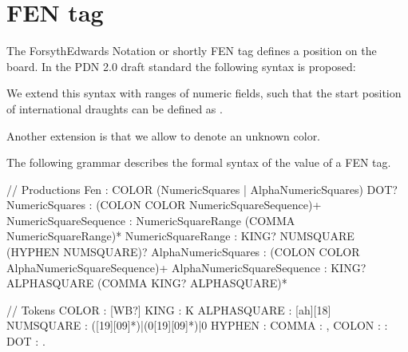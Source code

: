 \documentclass[letterpaper,10pt,english]{sphinxmanual}
\begin{document}
\sphinxstepscope


\chapter{FEN tag}
\label{\detokenize{fen:fen-tag}}\label{\detokenize{fen:fen-section}}\label{\detokenize{fen::doc}}
\sphinxAtStartPar
The Forsyth\sphinxhyphen{}Edwards Notation or shortly FEN tag defines a position on the board.
In the PDN 2.0 draft standard the following syntax is proposed:

\sphinxAtStartPar
{}

\sphinxAtStartPar
We extend this syntax with ranges of numeric fields, such that the start
position of international draughts can be defined as .

\sphinxAtStartPar
Another extension is that we allow  to denote an unknown color.

\sphinxAtStartPar
The following grammar describes the formal syntax of the value of a FEN tag.

\begin{sphinxVerbatim}[commandchars=\\\{\}]
// Productions
Fen                        : COLOR (NumericSquares | AlphaNumericSquares) DOT?
NumericSquares             : (COLON COLOR NumericSquareSequence)+
NumericSquareSequence      : NumericSquareRange (COMMA NumericSquareRange)*
NumericSquareRange         : KING? NUMSQUARE (HYPHEN NUMSQUARE)?
AlphaNumericSquares        : (COLON COLOR AlphaNumericSquareSequence)+
AlphaNumericSquareSequence : KING? ALPHASQUARE (COMMA KING? ALPHASQUARE)*

// Tokens
COLOR                      : \PYGZdq{}[WB?]\PYGZdq{}
KING                       : \PYGZdq{}K\PYGZdq{}
ALPHASQUARE                : \PYGZdq{}[a\PYGZhy{}h][1\PYGZhy{}8]\PYGZdq{}
NUMSQUARE                  : \PYGZdq{}([1\PYGZhy{}9][0\PYGZhy{}9]*)|(0[1\PYGZhy{}9][0\PYGZhy{}9]*)|0\PYGZdq{}
HYPHEN                     : \PYGZdq{}\PYGZbs{}\PYGZhy{}\PYGZdq{}
COMMA                      : \PYGZdq{}\PYGZbs{},\PYGZdq{}
COLON                      : \PYGZdq{}\PYGZbs{}:\PYGZdq{}
DOT                        : \PYGZdq{}\PYGZbs{}.\PYGZdq{}
\end{sphinxVerbatim}
\end{document}
